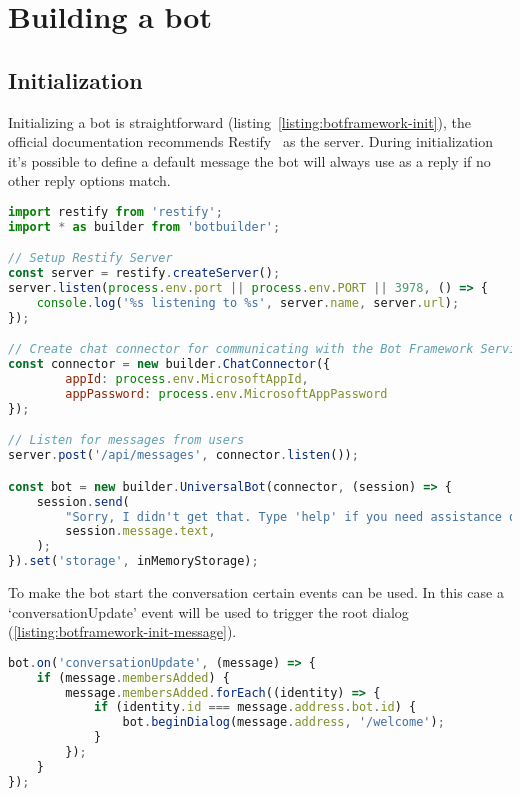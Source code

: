 \section{Building a bot}

\subsection{Initialization}

Initializing a bot is straightforward (listing~\ref{listing:botframework-init}), the official documentation recommends Restify~\cite{restify} as the server. During initialization it's possible to define a default message the bot will always use as a reply if no other reply options match.

\newpage

\begin{lstlisting}[language=JavaScript,caption={Initialization of a chatbot},label=listing:botframework-init]
import restify from 'restify';
import * as builder from 'botbuilder';

// Setup Restify Server
const server = restify.createServer();
server.listen(process.env.port || process.env.PORT || 3978, () => {
	console.log('%s listening to %s', server.name, server.url); 
});

// Create chat connector for communicating with the Bot Framework Service
const connector = new builder.ChatConnector({
		appId: process.env.MicrosoftAppId,
		appPassword: process.env.MicrosoftAppPassword
});

// Listen for messages from users 
server.post('/api/messages', connector.listen());

const bot = new builder.UniversalBot(connector, (session) => {
	session.send(
		"Sorry, I didn't get that. Type 'help' if you need assistance or try a different sentence.",
		session.message.text,
	);
}).set('storage', inMemoryStorage);
\end{lstlisting}

\newpage

To make the bot start the conversation certain events can be used. In this case a `conversationUpdate' event will be used to trigger the root dialog (\ref{listing:botframework-init-message}).

\begin{lstlisting}[language=JavaScript,caption={The root event of a bot},label=listing:botframework-init-message]
bot.on('conversationUpdate', (message) => {
	if (message.membersAdded) {
		message.membersAdded.forEach((identity) => {
			if (identity.id === message.address.bot.id) {
				bot.beginDialog(message.address, '/welcome');
			}
		});
	}
});
\end{lstlisting}

